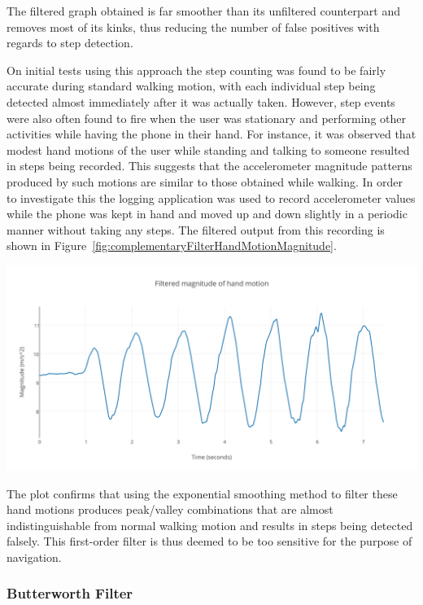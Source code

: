 \documentclass[main.tex]{subfiles}
\begin{document}
The filtered graph obtained is far smoother than its unfiltered counterpart and removes most of its kinks, thus reducing the number of false positives with regards to step detection.   

On initial tests using this approach the step counting was found to be fairly accurate during standard walking motion, with each individual step being detected almost immediately after it was actually taken. However, step events were also often found to fire when the user was stationary and performing other activities while having the phone in their hand. For instance, it was observed that modest hand motions of the user while standing and talking to someone resulted in steps being recorded. This suggests that the accelerometer magnitude patterns produced by such motions are similar to those obtained while walking. In order to investigate this the logging application was used to record accelerometer values while the phone was kept in hand and moved up and down slightly in a periodic manner without taking any steps. The filtered output from this recording is shown in Figure~\ref{fig:complementaryFilterHandMotionMagnitude}. 

\begin{center}
\includegraphics[scale=0.9]{images/complementaryFilterHandMotionMagnitude.png}
\label{fig:complementaryFilterHandMotionMagnitude}
\end{center}
The plot confirms that using the exponential smoothing method to filter these hand motions produces peak/valley combinations that are almost indistinguishable from normal walking motion and results in steps being detected falsely. This first-order filter is thus deemed to be too sensitive for the purpose of navigation. 

\subsubsection{Butterworth Filter}
\end{document}
